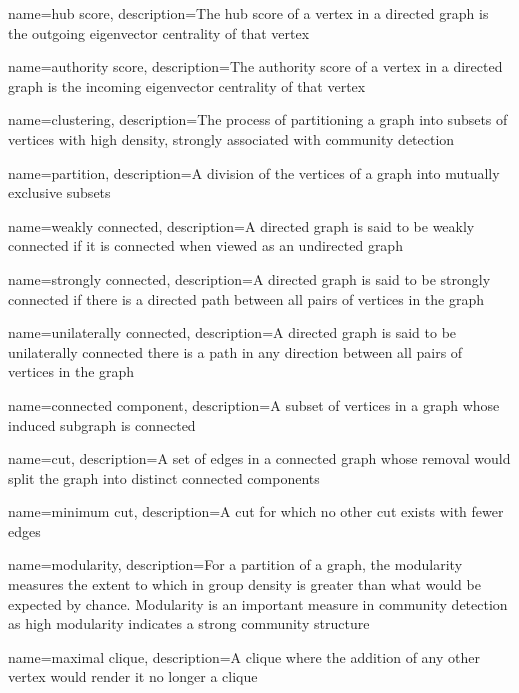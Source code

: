 {
    name={hub score},
    description={The hub score of a vertex in a directed graph is the outgoing eigenvector centrality of that vertex}
}

{
    name={authority score},
    description={The authority score of a vertex in a directed graph is the incoming eigenvector centrality of that vertex}
}

{
    name={clustering},
    description={The process of partitioning a graph into subsets of vertices with high density, strongly associated with community detection}
}

{
    name={partition},
    description={A division of the vertices of a graph into mutually exclusive subsets}
}

{
    name={weakly connected},
    description={A directed graph is said to be weakly connected if it is connected when viewed as an undirected graph}
}

{
    name={strongly connected},
    description={A directed graph is said to be strongly connected if there is a directed path between all pairs of vertices in the graph}
}

{
    name={unilaterally connected},
    description={A directed graph is said to be unilaterally connected there is a path in any direction between all pairs of vertices in the graph}
}

{
    name={connected component},
    description={A subset of vertices in a graph whose induced subgraph is connected}
}

{
    name={cut},
    description={A set of edges in a connected graph whose removal would split the graph into distinct connected components}
}

{
    name={minimum cut},
    description={A cut for which no other cut exists with fewer edges}
}

{
    name={modularity},
    description={For a partition of a graph, the modularity measures the extent to which in group density is greater than what would be expected by chance.  Modularity is an important measure in community detection as high modularity indicates a strong community structure}
}

{
    name={maximal clique},
    description={A clique where the addition of any other vertex would render it no longer a clique}
}


